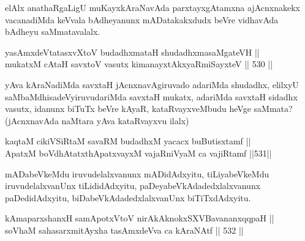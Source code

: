 \begin{artha}
elAlx anathaRgaLigU muKayxkAraNavAda parxtayxgAtamxna ajAcnxnakekx
vacanadiMda keVvala bAdheyanunx mADatakakxdudx beVre vidhavAda bAdheyu
saMmatavalalx.
\end{artha}

\begin{shl}
yasAmxdeVtatasxvXtoV budadhxmataH shudadhxmasaMgateVH || \\
mukatxM cAtaH savxtoV vasutx kimanayxtAkxyaRmiSayxteV \hfill || 530 ||  
\end{shl}

\begin{artha}
yAva kAraNadiMda savxtaH jAcnxnavAgiruvado adariMda shudadhx, elilxyU
saMbaMdhisadeVyiruvudariMda savxtaH mukatx, adariMda savxtaH sidadhx
vasutx, idanunx biTuTx beVre kAyaR, kataRvayxveMbudu heVge saMmata?
(jAcnxnavAda naMtara yAva kataRvayxvu ilalx)
\end{artha}






\begin{shl}
kaqtaM cikiVSiRtaM savaRM budadhxM yacacx buButisxtamf || \\
ApatxM boVdhAtatxthA\s \s patxvayxM vajaRniVyaM ca vajiRtamf \hfill ||531||  
\end{shl}

\begin{artha}
mADabeVkeMdu iruvudelalxvanunx mADidAdxyitu, tiLiya\-\break beVkeMdu
iruvudelalxvanUnx tiLididAdxyitu, paDeyabeVkAdadedxlalxvanunx
paDedidAdxyitu, biDabeVkAdadedxlalxvanUnx biTiTxdAdxyitu.
\end{artha}


\begin{shl}
kAmaparxshanxH samApotxV\s toV nirAkAknokxSXV\s BavananxqqpaH || \\
soV\s haM sahasarxmitAyxha tasAmxdeVva ca kAraNAtf \hfill || 532 ||  
\end{shl}


